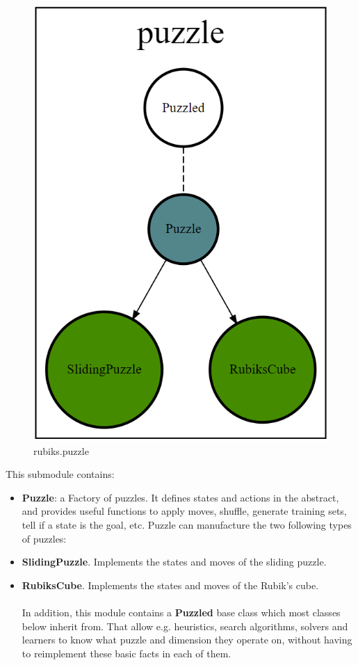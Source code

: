 \begin{figure}[H]
\centering
\includegraphics[scale=0.25]{./Figures/codebasepuzzle}
\caption[Codebase]{rubiks.puzzle}
\label{fig:Codebasepuzzle}
\end{figure}
This submodule contains:
\begin{itemize}
\item \textbf{Puzzle}: a Factory of puzzles. It defines states and actions in the abstract, and provides useful functions to apply moves, shuffle, generate training sets, tell if a state is the goal, etc. Puzzle can manufacture the two following types of puzzles:
\item \textbf{SlidingPuzzle}. Implements the states and moves of the sliding puzzle.
\item \textbf{RubiksCube}. Implements the states and moves of the Rubik's cube.
\\
\\
In addition, this module contains a \textbf{Puzzled} base class which most classes below inherit from. That allow e.g. heuristics, search algorithms, solvers and learners to know what puzzle and dimension they operate on, without having to reimplement these basic facts in each of them.
\end{itemize}

